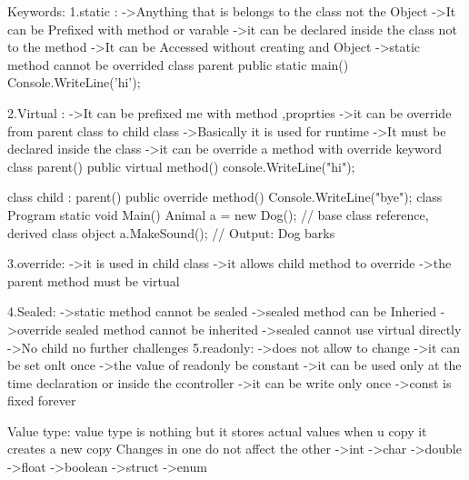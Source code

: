 Keywords:
        1.static :
         ->Anything that is belongs to the class not the Object 
         ->It can be Prefixed with method or varable
         ->it can be declared inside the class not to the method
         ->It can be Accessed without creating and Object
         ->static method cannot be overrided
         class parent{
                public static main(){
                        Console.WriteLine('hi');
                }
         }

         2.Virtual :
                ->It can be prefixed me with method ,proprties
                ->it can be override from parent class to child class
                ->Basically it is used for runtime
                ->It must be declared inside the class
                ->it can be override a method with override keyword
                class parent(){
                        public virtual method(){
                                console.WriteLine("hi");
                        }
                }

                class child : parent(){
                        public override method(){
                                Console.WriteLine("bye");
                        }
                }
                class Program
                {
                static void Main()
                {
                        Animal a = new Dog(); // base class reference, derived class object
                        a.MakeSound();        // Output: Dog barks
                }
                }

        3.override:
                        ->it is used in child class
                        ->it allows child method to override
                        ->the parent method must be virtual

        4.Sealed:
                        ->static method cannot be sealed
                        ->sealed method can be Inheried
                        ->override sealed method cannot be inherited
                        ->sealed cannot use virtual directly
                        ->No child no further challenges
        5.readonly:
                        ->does not allow to change
                        ->it can be set onlt once 
                        ->the value of readonly be constant
                        ->it can be used only at the time declaration or inside the ccontroller
                        ->it can be write only once
                        ->const is fixed forever

Value type:
                value type is nothing but it stores actual values
                when u copy it creates a new copy
                Changes in one do not affect the other
                ->int
                ->char
                ->double
                ->float
                ->boolean
                ->struct
                ->enum

